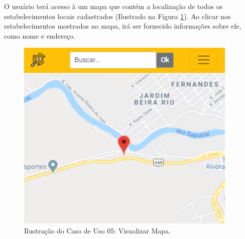 O usuário terá acesso à um mapa que contém a localização de todos os estabelecimentos locais cadastrados (Ilustrado na Figura \ref{fig:mapa}). Ao clicar nos estabelecimentos mostrados no mapa, irá ser fornecido informações sobre ele, como nome e endereço.

\begin{figure}[H]
\centering
\includegraphics[width=\linewidth]{figuras/tela_mapa.png}
\caption{Ilustração do Caso de Uso 05: Visualizar Mapa.}
\label{fig:mapa}
\end{figure}
